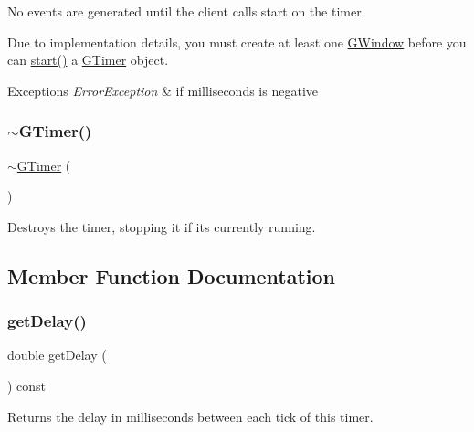 No events are generated until the client calls {\ttfamily start} on the timer.

Due to implementation details, you must create at least one \mbox{\hyperlink{classGWindow}{G\+Window}} before you can \mbox{\hyperlink{classGTimer_a60de64d75454385b23995437f1d72669}{start()}} a \mbox{\hyperlink{classGTimer}{G\+Timer}} object.


\begin{DoxyExceptions}{Exceptions}
{\em Error\+Exception} & if milliseconds is negative \\
\hline
\end{DoxyExceptions}
\mbox{\label{classGTimer_a2f693771957cae3efd9bfc952c543961}} 
\subsubsection{\texorpdfstring{$\sim$\+G\+Timer()}{~GTimer()}}
{\footnotesize\ttfamily $\sim$\mbox{\hyperlink{classGTimer}{G\+Timer}} (\begin{DoxyParamCaption}{ }\end{DoxyParamCaption})}



Destroys the timer, stopping it if it\textquotesingle{}s currently running. 



\subsection{Member Function Documentation}
\mbox{\label{classGTimer_a73d6fbcedb3f4c8379a76161503dc8f8}} 
\subsubsection{\texorpdfstring{get\+Delay()}{getDelay()}}
{\footnotesize\ttfamily double get\+Delay (\begin{DoxyParamCaption}{ }\end{DoxyParamCaption}) const}



Returns the delay in milliseconds between each tick of this timer. 

\mbox{\label{classGTimer_ac1991ea0e286fbb461b60c8c9299d781}} 
